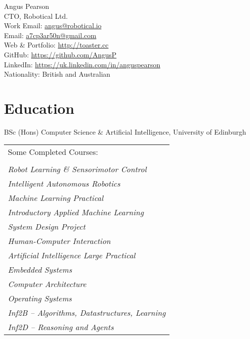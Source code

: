 \documentclass[10pt, a4paper]{article}
\newcommand{\years}[1]{\marginnote{\scriptsize #1}}
\begin{document}
{\huge Angus Pearson}\\[1cm]
CTO, Robotical Ltd.\\

Work Email: \href{mailto:angus@robtical.io}{angus@robotical.io}\\
Email: \href{mailto:a7cp3ar50n@gmail.com}{a7cp3ar50n@gmail.com}\\
Web \& Portfolio:   \href{http://toaster.cc}{http://toaster.cc}\\
GitHub: \href{https://github.com/AngusP}{https://github.com/AngusP} \\
LinkedIn: \href{https://uk.linkedin.com/in/anguspearson}{https://uk.linkedin.com/in/anguspearson}\\


Nationality:  British and Australian

\section*{Education}

\years{2013-2017} BSc (Hons) Computer Science \& Artificial Intelligence, University of Edinburgh\\

\begin{tabular}{l}
  Some Completed Courses:\\
  \\
  \emph{Robot Learning \& Sensorimotor Control}\\
  \emph{Intelligent Autonomous Robotics}\\
  \emph{Machine Learning Practical}\\
  \emph{Introductory Applied Machine Learning}\\
  \emph{System Design Project}\\
  \emph{Human-Computer Interaction}\\
  \emph{Artificial Intelligence Large Practical}\\
  \emph{Embedded Systems}\\
  \emph{Computer Architecture}\\
  \emph{Operating Systems}\\
  \emph{Inf2B -- Algorithms, Datastructures, Learning}\\
  \emph{Inf2D -- Reasoning and Agents}\\
\end{tabular}\\
\end{document}
